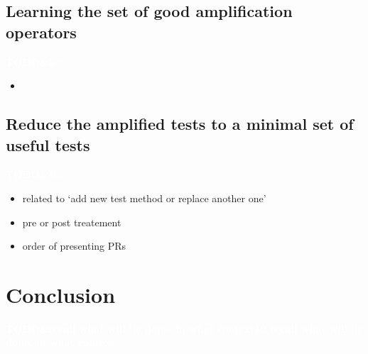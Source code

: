 \documentclass[11pt]{sdm}
\newcommand{\todo}[1]{\colorbox{Red!75}{\textcolor{white}{\textbf{TODO\ifx&#1&\else: #1\fi}}}}
\begin{document}
\subsection{Learning the set of good amplification operators}
\label{learning}
\todo{}

\begin{itemize}
  \item
\end{itemize}

\subsection{Reduce the amplified tests to a minimal set of useful tests}
\label{minimal}
\todo{}

\begin{itemize}
  \item related to `add new test method or replace another one'
  \item pre or post treatement
  \item order of presenting PRs
\end{itemize}


\section*{Conclusion}
\label{conclu}
\todo{recall what will be done, in what context}




\end{document}
